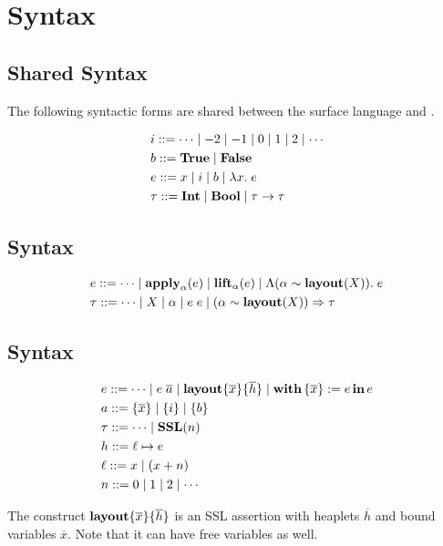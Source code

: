 \section{Syntax}

\subsection{Shared Syntax}

The following syntactic forms are shared between the \Pika{} surface language and \PikaCore.

\begin{align*}
  &i ::= \cdots \mid -2 \mid -1 \mid 0 \mid 1 \mid 2 \mid \cdots
  \\
  &b ::= \textbf{True}{} \mid \textbf{False}
  \\
  &e ::= x \mid i \mid b \mid \lambda x.\; e
  \\
  &\tau ::= \textbf{Int} \mid \textbf{Bool} \mid \tau \rightarrow \tau
\end{align*}

\subsection{\Pika{} Syntax}
\begin{align*}
  &e ::= \cdots \mid \textbf{apply}_{\alpha}(e) \mid \textbf{lift}_{\alpha}(e) \mid \Lambda (\alpha \sim \textbf{layout}(X)).\; e
  \\
  &\tau ::= \cdots \mid X \mid \alpha \mid e\; e \mid (\alpha \sim \textbf{layout}(X)) \Rightarrow \tau
\end{align*}

\subsection{\PikaCore{} Syntax}
\begin{align*}
  &e ::= \cdots \mid e\; \overline{a} \mid \textbf{layout}\{ \overline{x} \}\{ \overline{h} \} \mid \textbf{with}\,\{ \overline{x} \} := e\,\textbf{in}\, e
  \\
  &a ::= \{ \overline{x} \} \mid \{ i \} \mid \{ b \}
  \\
  &\tau ::= \cdots \mid \textbf{SSL}(n)
  \\
  &h ::= \ell \mapsto e
  \\
  &\ell ::= x \mid (x + n)
  \\
  &n ::= 0 \mid 1 \mid 2 \mid \cdots
\end{align*}

The construct $\textbf{layout}\{ \overline{x} \}\{ \overline{h} \}$ is an SSL assertion with heaplets $\overline{h}$ and
bound variables $\overline{x}$. Note that it can have free variables as well.

